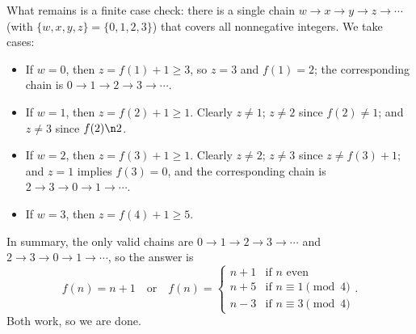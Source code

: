 What remains is a finite case check: there is a single chain $w\to x\to y\to z\to\cdots$ (with $\{w,x,y,z\}=\{0,1,2,3\}$) that covers all nonnegative integers. We take cases:
\begin{itemize}
    \item If $w=0$, then $z=f(1)+1\ge3$, so $z=3$ and $f(1)=2$; the corresponding chain is $0\to1\to2\to3\to\cdots$.
    \item If $w=1$, then $z=f(2)+1\ge1$. Clearly $z\ne1$; $z\ne2$ since $f(2)\ne1$; and $z\ne3$ since $f(2)\n2$.
    \item If $w=2$, then $z=f(3)+1\ge1$. Clearly $z\ne2$; $z\ne3$ since $z\ne f(3)+1$; and $z=1$ implies $f(3)=0$, and the corresponding chain is $2\to3\to0\to1\to\cdots$.
    \item If $w=3$, then $z=f(4)+1\ge5$.
\end{itemize}
In summary, the only valid chains are $0\to1\to2\to3\to\cdots$ and $2\to3\to0\to1\to\cdots$, so the answer is
\[
    \boxed{f(n)=n+1}\quad\text{or}\quad\boxed{f(n)=
        \begin{cases}
            n+1&\text{if $n$ even}\\
            n+5&\text{if $n\equiv1\pmod4$}\\
            n-3&\text{if $n\equiv3\pmod4$}
    \end{cases} }.
\]
Both work, so we are done.


